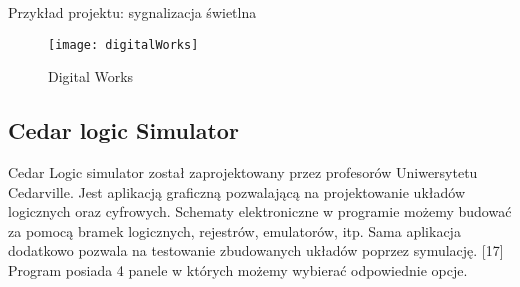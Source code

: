 \documentclass[12pt, a4paper, onside, polish]{article}				%
\begin{document}
\cleardoublepage
Przykład projektu: sygnalizacja świetlna
\begin{figure}[H]
{\centering \texttt{[image: digitalWorks]} \caption{Digital Works}}\vspace{5mm}
\end{figure}

\subsection{Cedar logic Simulator}
\hspace{\parindent}
Cedar Logic simulator został zaprojektowany przez profesorów Uniwersytetu Cedarville. Jest aplikacją graficzną pozwalającą na projektowanie układów logicznych oraz cyfrowych. Schematy elektroniczne w programie możemy budować za pomocą bramek logicznych, rejestrów, emulatorów, itp. Sama aplikacja dodatkowo pozwala na testowanie zbudowanych układów poprzez symulację. [17] \newline\newline
Program posiada 4 panele w których możemy wybierać odpowiednie opcje.
\end{document}
